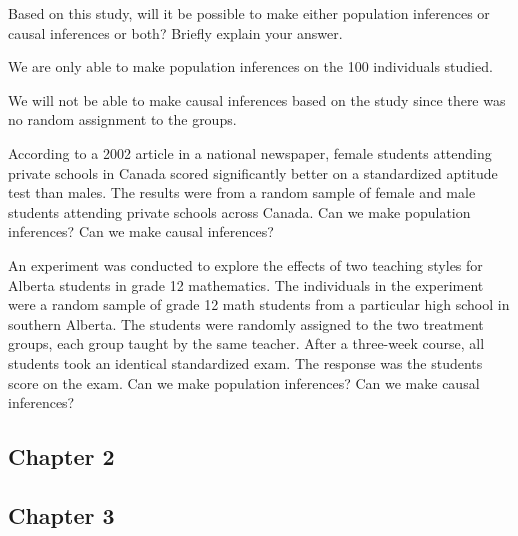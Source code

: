 \documentclass{article}
\theoremstyle{plain}
\theoremstyle{definition}
\theoremstyle{definition}
\begin{document}
\begin{question}
    Based on this study, will it be possible to make either population inferences or causal inferences or
    both? Briefly explain your answer.
\end{question}
\begin{answer}
    We are only able to make population inferences on the 100 individuals studied.
    
    We will not be able to make causal inferences based on the study since there was no random assignment to the groups.
\end{answer}

\begin{question}
    According to a 2002 article in a national newspaper, female students attending private schools in Canada
    scored significantly better on a standardized aptitude test than males. The results were from a random
    sample of female and male students attending private schools across Canada. Can we make population
    inferences? Can we make causal inferences?
\end{question}

\begin{question}
    An experiment was conducted to explore the effects of two teaching styles for Alberta students in grade
    12 mathematics. The individuals in the experiment were a random sample of grade 12 math students
    from a particular high school in southern Alberta. The students were randomly assigned to the two
    treatment groups, each group taught by the same teacher. After a three-week course, all students took
    an identical standardized exam. The response was the students score on the exam. Can we make
    population inferences? Can we make causal inferences?
\end{question}
\subsection{Chapter 2}
\subsection{Chapter 3}
\end{document}
